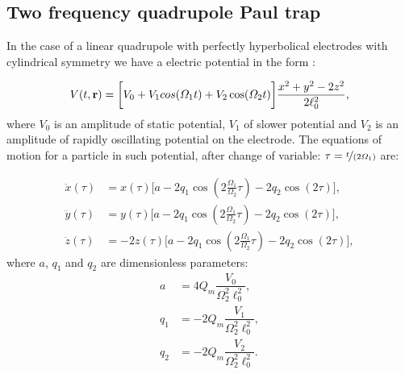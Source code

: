 \chapter{}
\label{chap:math}


\section{Two frequency quadrupole Paul trap}
\label{sec:two frequency trap}
In the case of a linear quadrupole with perfectly hyperbolical electrodes with cylindrical symmetry we have a electric potential in the form \cite{leefer2017investigation}
:

\begin{equation}
	V(t, \vb{r}) = \bigg[ V_0 + V_1 cos(\Omega_1 t) + V_2 \cos(\Omega_2 t) \bigg] \frac{x^2 + y^2 - 2 z^2 }{2 \ell_0^2},
\end{equation}
where $V_0$ is an amplitude of static potential, $V_1$ of slower potential and $V_2$ is an amplitude of rapidly oscillating potential on the electrode. The equations of motion for a particle in such potential, after change of variable: $\tau = \nicefrac{t}{(2 \Omega_1)}$ are:

\begin{subequations}
\begin{align}
	\ddot{x}(\tau) & = x(\tau) \bigg[ a - 2 q_1 \cos\left(2\frac{\Omega_1}{\Omega_2} \tau \right) - 2 q_2 \cos(2\tau) \bigg], \\
	\ddot{y}(\tau) & = y(\tau) \bigg[ a - 2 q_1 \cos\left(2\frac{\Omega_1}{\Omega_2} \tau \right) - 2 q_2 \cos(2\tau) \bigg], \\
	\label{studied eq of motion}
	\ddot{z}(\tau) & = -2z(\tau) \bigg[ a - 2 q_1 \cos\left(2\frac{\Omega_1}{\Omega_2} \tau \right) - 2 q_2 \cos(2\tau) \bigg],
\end{align}
\end{subequations}
where $a$, $q_1$ and $q_2$ are dimensionless parameters:
\begin{subequations}
\begin{align}
	a & = 4 Q_m \dfrac{V_0}{\Omega_2^2 \ell_0^2}, \\
	q_1 & = -2 Q_m \dfrac{V_1}{\Omega_2^2 \ell_0^2}, \\
	q_2 & = -2 Q_m \dfrac{V_2}{\Omega_2^2 \ell_0^2}.
\end{align}
\end{subequations}


